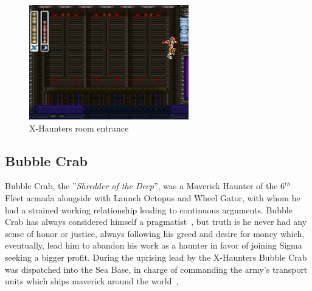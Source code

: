 \begin{figure}[htp]
	\centering
	\includegraphics[height=5cm]{figures/X2/Bubble_crab/Crab_haunter_room.png}
	\caption{X-Haunters room entrance}
\end{figure}

\subsection{Bubble Crab}\label{boss:Bubble_crab}
Bubble Crab, the ''\textit{Shredder of the Deep}'', was a Maverick Haunter of the 6$^{th}$ Fleet armada alongside with Launch Octopus and Wheel Gator, with whom he had a strained working relationship leading to continuous arguments. Bubble Crab has always considered himself a pragmatist~\cite{Xcoll1:Manual_X2}, but truth is he never had any sense of honor or justice, always following his greed and desire for money which, eventually, lead him to abandon his work as a haunter in favor of joining Sigma seeking a bigger profit. During the uprising lead by the X-Haunters Bubble Crab was dispatched into the Sea Base, in charge of commanding the army's transport units which ships maverick around the world~\cite{wiki:Bubble_Crab}, \cite{wayback:X2_resources}

